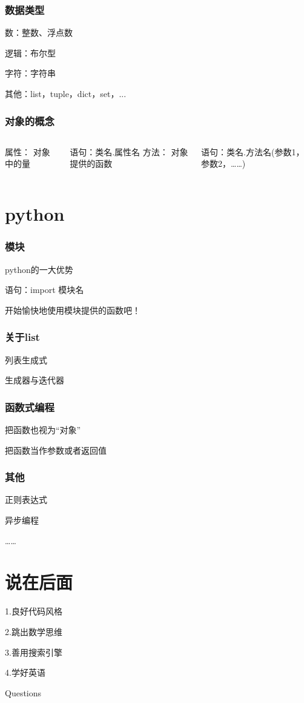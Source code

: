\documentclass[presentation]{beamer}
\begin{document}
\begin{frame}
    \frametitle{数据类型}
    数：整数、浮点数\par
    逻辑：布尔型\par
    字符：字符串\par
    其他：list，tuple，dict，set，...
\end{frame}

\begin{frame}
    \frametitle{对象的概念}\centering
    \begin{columns}
    属性：
    对象中的量\par
    语句：类名.属性名
    方法：
    对象提供的函数\par
    语句：类名.方法名(参数1，参数2，……)
    \end{columns}
\end{frame}

\section{python}

\begin{frame}
    \frametitle{模块}
    python的一大优势\par
    语句：import 模块名\par
    开始愉快地使用模块提供的函数吧！
\end{frame}

\begin{frame}
    \frametitle{关于list}
    列表生成式\par
    生成器与迭代器
\end{frame}

\begin{frame}
    \frametitle{函数式编程}
    把函数也视为“对象”\par
    把函数当作参数或者返回值
\end{frame}

\begin{frame}
    \frametitle{其他}\centering
    正则表达式\par
    异步编程\par
    ……
\end{frame}

\section{说在后面}

\begin{frame}\centering
    1.良好代码风格
    \par
    2.跳出数学思维
    \par
    3.善用搜索引擎
    \par
    4.学好英语
\end{frame}


\begin{frame}[standout]
    Questions
\end{frame}
\end{document}
